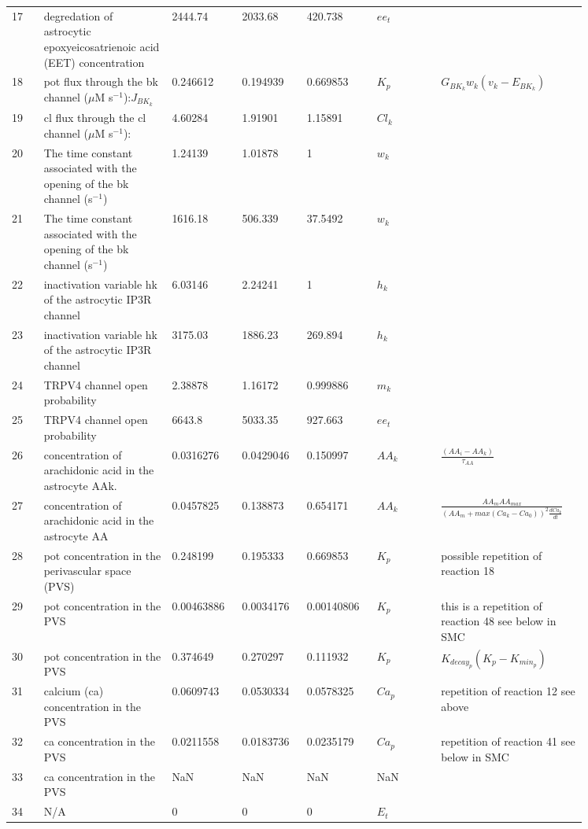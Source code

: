 \documentclass[]{article}
\newcommand{\mus}{$\mu$M s$^{-1}$\xspace}
\newcommand{\psec}{s$^{-1}$\xspace}
\newcommand{\pot}{\gls{pot}\xspace}
\newcommand{\cl}{\gls{cl}\xspace}
\newcommand{\ca}{\gls{ca}\xspace}
\begin{document}
\begin{longtable}[h!] { p{0.05\linewidth}  p{0.2\linewidth} p{0.1\linewidth}  p{0.10\linewidth} p{0.10\linewidth} p{0.1\linewidth}   p{0.2\linewidth} }
17	&degredation of astrocytic epoxyeicosatrienoic acid (EET) concentration	&2444.74	&	2033.68	&	420.738	&$ee_t$&\\
18&	\pot flux through the \gls{bk} channel (\mus):$J_{BK_k}$&	0.246612	&	0.194939	&	0.669853&	$K_p$&$  G_{BK_k}w_k\left( v_k-E_{BK_k} \right)$\\
19	&\cl flux through the \cl channel (\mus):	&4.60284	&	1.91901	&	1.15891	&$Cl_k$&\\
20	&The time constant associated with the opening of the \gls{bk} channel (\psec) &	1.24139		&1.01878	&	1&	$w_k$&\\
21	&The time constant associated with the opening of the \gls{bk} channel (\psec) &	1616.18	&	506.339	&	37.5492	&$w_k$&\\
22&	inactivation variable hk of the astrocytic IP3R channel	&6.03146	&	2.24241	&	1&	$h_k$&\\
23	&inactivation variable hk of the astrocytic IP3R channel&	3175.03	&	1886.23	&	269.894	&$h_k$&\\
24&	TRPV4 channel open probability&	2.38878	&	1.16172	&	0.999886&	$m_k$&\\
25&	TRPV4 channel open probability	&6643.8	&	5033.35	&	927.663&	$ee_t$&\\
26&	concentration of arachidonic acid in the astrocyte AAk.	&0.0316276	&	0.0429046	&	0.150997&	$AA_k$&$\frac{(AA_i - AA_k)}{\tau_{AA}}$\\
27	&concentration of arachidonic acid in the astrocyte AA &	0.0457825	&	0.138873	&	0.654171&	$AA_k$&$\frac{AA_m  AA_{max}}{(AA_m + max(Ca_k - Ca_0))^2 \frac{dCa_k}{dt}} $ \\
28	&\pot concentration in the perivascular space (PVS)	&0.248199	&	0.195333	&	0.669853&	$K_p$& possible repetition of reaction 18 \\
29&	\pot concentration in the PVS	&0.00463886	&	0.0034176	&	0.00140806&	$K_p$& this is a repetition of reaction 48 see below in SMC\\
30&	\pot concentration in the PVS	&0.374649	&	0.270297	&	0.111932&	$K_p$ &$K_{decay_p} (K_p - K_{min_p})$\\
31	&calcium (\ca) concentration in the PVS&	0.0609743	&	0.0530334	&	0.0578325&	$Ca_p$ &{repetition of reaction 12 see above}\\
32	&\ca concentration in the PVS&	0.0211558	&	0.0183736	&	0.0235179&	$Ca_p$&{repetition of reaction 41 see below in SMC}\\
33&	\ca concentration in the PVS&	NaN	&	NaN	&	NaN	&NaN\\
34	&N/A&	0	&	0	&	0	&$E_t$\\

\end{longtable}
\end{document}
